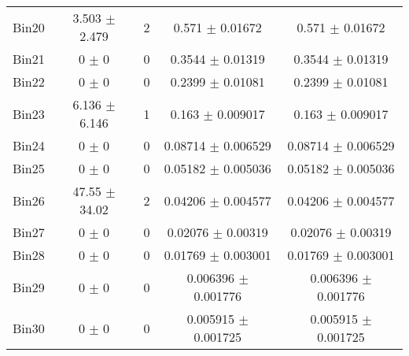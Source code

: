 \begin{tabular}{@{\extracolsep{4pt}}lcccc@{}}
     Bin20 & 3.503 $\pm$ 2.479 & 2 & 0.571 $\pm$ 0.01672 & 0.571 $\pm$ 0.01672 \\ 
     Bin21 & 0 $\pm$ 0 & 0 & 0.3544 $\pm$ 0.01319 & 0.3544 $\pm$ 0.01319 \\ 
     Bin22 & 0 $\pm$ 0 & 0 & 0.2399 $\pm$ 0.01081 & 0.2399 $\pm$ 0.01081 \\ 
     Bin23 & 6.136 $\pm$ 6.146 & 1 & 0.163 $\pm$ 0.009017 & 0.163 $\pm$ 0.009017 \\ 
     Bin24 & 0 $\pm$ 0 & 0 & 0.08714 $\pm$ 0.006529 & 0.08714 $\pm$ 0.006529 \\ 
     Bin25 & 0 $\pm$ 0 & 0 & 0.05182 $\pm$ 0.005036 & 0.05182 $\pm$ 0.005036 \\ 
     Bin26 & 47.55 $\pm$ 34.02 & 2 & 0.04206 $\pm$ 0.004577 & 0.04206 $\pm$ 0.004577 \\ 
     Bin27 & 0 $\pm$ 0 & 0 & 0.02076 $\pm$ 0.00319 & 0.02076 $\pm$ 0.00319 \\ 
     Bin28 & 0 $\pm$ 0 & 0 & 0.01769 $\pm$ 0.003001 & 0.01769 $\pm$ 0.003001 \\ 
     Bin29 & 0 $\pm$ 0 & 0 & 0.006396 $\pm$ 0.001776 & 0.006396 $\pm$ 0.001776 \\ 
     Bin30 & 0 $\pm$ 0 & 0 & 0.005915 $\pm$ 0.001725 & 0.005915 $\pm$ 0.001725 \\ 
\hline\hline
  \end{tabular}
